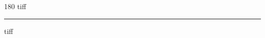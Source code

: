 
\begin{frame}
\begin{center}
\begin{turn}{180}
{\fontsize{2.5cm}{1em}\selectfont tiff}
\end{turn}
\vspace{1em}\par  
\hrule
\vspace{1em}\par  
{\fontsize{2.5cm}{1em}\selectfont tiff}
\end{center}
\end{frame}
